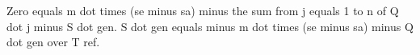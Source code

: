 Zero equals m dot times (se minus sa) minus the sum from j equals 1 to n of Q dot j minus S dot gen.  
S dot gen equals minus m dot times (se minus sa) minus Q dot gen over T ref.